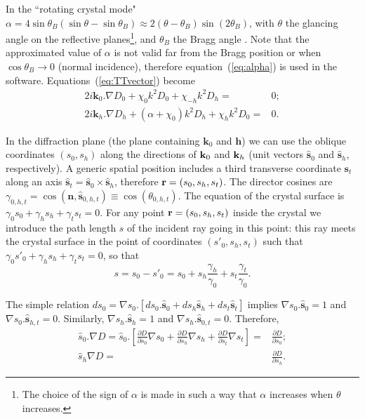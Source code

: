 \documentclass[preprint]{iucr}              %
\newcommand{\inred}[1]{{\color{red}#1}}
\begin{document}
In the ``rotating crystal mode" $\alpha=4 \sin \theta_B (\sin \theta - \sin \theta_B) \approx 2 (\theta-\theta_B) \sin (2\theta_B)$, with $\theta$ the glancing angle on the reflective planes\footnote{
The choice of the sign of $\alpha$ is made in such a way that $\alpha$ increases when $\theta$ increases. 
}, and $\theta_B$ the Bragg angle .
Note that the approximated value of $\alpha$ is not valid far from the Bragg position or when $\cos\theta_B \rightarrow 0$ (normal incidence), therefore  equation~(\ref{eq:alpha}) is used in the software.
Equations~(\ref{eq:TTvector})  become
\begin{subequations}
\label{eq:TTvectorAlpha}
\begin{align}
2 i \textbf{k}_0 . \nabla D_0 + \chi_0 k^2 D_0 + \chi_{-h} k^2 D_h =& 0; \\
2 i \textbf{k}_h . \nabla D_h + (\alpha + \chi_0) k^2 D_h + \chi_{h} k^2 D_0 =& 0.
\end{align}
\end{subequations}

In the diffraction plane (the plane containing $\textbf{k}_0$ and $\textbf{h}$) 
we can use the oblique coordinates $(s_0,s_h)$ along the directions of $\textbf k_0$ and $\textbf k_h$ (unit vectors $\hat{ \textbf{s}}_{0}$ and $\hat{ \textbf{s}}_{h}$, respectively). A generic spatial position includes a third transverse coordinate $\textbf{s}_t$ along an axis $\hat{\textbf{s}}_t=\hat{\textbf{s}}_0 \times \hat{\textbf{s}}_h$, therefore $\textbf r=(s_0,s_h,s_t)$. The director cosines are $\gamma_{0,h,t}=\cos(\textbf{n} , \hat{\textbf{s}}_{0,h,t}) \equiv \cos(\theta_{0,h,t})$. The equation of the crystal surface is $\gamma_0 s_0 + \gamma_h s_h + \gamma_t s_t=0$. For any point $\textbf r=(s_0,s_h,s_t)$ inside the crystal we introduce the path length $s$ of the incident ray going in this point: this ray meets the crystal surface in the point of coordinates $(s'_0,s_h,s_t)$ such that $\gamma_0 s'_0+\gamma_h s_h + \gamma_t s_t=0$, so that 
\begin{equation}
\label{eq:s}
s = s_0 - s'_0 = s_0 + s_h \frac{\gamma_h}{\gamma_0} + s_t \frac{\gamma_t}{\gamma_0}.
\end{equation}

The simple relation $d s_0 = \nabla s_0 . [ d s_0 . \hat{\textbf{s}}_0 + d s_h \hat{\textbf{s}}_h + d s_t \hat{\textbf{s}}_t ]$ implies $\nabla s_0 . \hat{\textbf{s}}_0=1$ and $\nabla s_0 . \hat{\textbf{s}}_{h,t}=0$. Similarly, $\nabla s_h . \hat{\textbf{s}}_h=1$ and $\nabla s_h . \hat{\textbf{s}}_{0,t}=0$. Therefore, 
\begin{subequations}
\label{eq:equalities}
\begin{align}
\hat s_0 . \nabla D=
\hat s_0 . \left[ 
\frac{\partial D}{\partial s_0} \nabla s_0 + 
\frac{\partial D}{\partial s_h} \nabla s_h +
\frac{\partial D}{\partial s_t} \nabla s_t
\right] 
=& \frac{\partial D}{\partial s_0}
; \\
\hat s_h \nabla D =& 
\frac{\partial D}{\partial s_h}.
\end{align}
\end{subequations}
\end{document}
